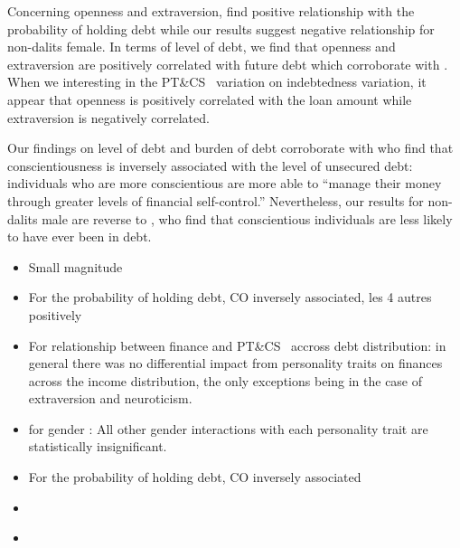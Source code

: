 \documentclass[a4paper, 11pt, onecolumn]{article}
\newcommand{\PTCS}{PT\&CS}
\begin{document}
Concerning openness and extraversion, \cite{Brown2014} find positive relationship with the probability of holding debt while our results suggest negative relationship for non-dalits female.
In terms of level of debt, we find that openness and extraversion are positively correlated with future debt which corroborate with \cite{Brown2014}.
When we interesting in the \PTCS~ variation on indebtedness variation, it appear that openness is positively correlated with the loan amount while extraversion is negatively correlated.

Our findings on level of debt and burden of debt corroborate with \cite{Brown2014, Donnelly2012} who find that conscientiousness is inversely associated with the level of unsecured debt: individuals who are more conscientious are more able to ``manage their money through greater levels of financial self-control.''
Nevertheless, our results for non-dalits male are reverse to \cite{Nyhus2001, Brown2014}, who find that conscientious individuals are less likely to have ever been in debt.



\cite{Brown2014}
\begin{itemize}
\item Small magnitude
\item For the probability of holding debt, CO inversely associated, les 4 autres positively
\item For relationship between finance and \PTCS~ accross debt distribution: in general there was no differential impact from personality traits on finances across the income distribution, the only exceptions being in the case of extraversion and neuroticism.
\item for gender : All other gender interactions with each personality trait are statistically insignificant.
\end{itemize}

\cite{Donnelly2012}
\begin{itemize}
\item For the probability of holding debt, CO inversely associated
\end{itemize}


\cite{Forlicz2019}
\begin{itemize}
\item 
\end{itemize}

\cite{Bertaut2002}
\begin{itemize}
\item 
\end{itemize}
\end{document}
